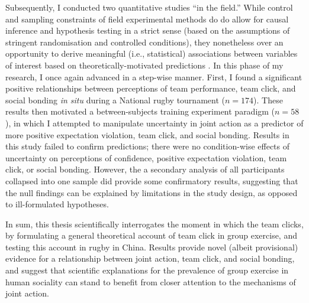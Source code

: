 \begin{CJK}{UTF8}{gbsn}
Subsequently, I conducted two quantitative studies ``in the field.''  While control and sampling constraints of field experimental methods do do allow for causal inference and hypothesis testing in a strict sense (based on the assumptions of stringent randomisation and controlled conditions), they nonetheless over an opportunity to derive meaningful (i.e., statistical) associations between variables of interest based on theoretically-motivated predictions \citep{Xygalatas2013}.  In this phase of my research, I once again advanced in a step-wise manner.  First, I found a significant positive relationships between perceptions of team performance, team click, and social bonding \textit{in situ} during a National rugby tournament ($n = 174$).  These results then motivated a between-subjects training experiment paradigm ($n = 58$), in which I attempted to manipulate uncertainty in joint action as a predictor of more positive expectation violation, team click, and social bonding.  Results in this study failed to confirm predictions; there were no condition-wise effects of uncertainty on perceptions of confidence, positive expectation violation, team click, or social bonding.   However, the a secondary analysis of all participants collapsed into one sample did provide some confirmatory results, suggesting that the null findings can be explained by limitations in the study design, as opposed to ill-formulated hypotheses.

In sum, this thesis scientifically interrogates the moment in which the team clicks, by formulating a general theoretical account of team click in group exercise, and testing this account in rugby in China.  Results provide novel (albeit provisional) evidence for a relationship between joint action, team click, and social bonding, and suggest that scientific explanations for the prevalence of group exercise in human sociality can stand to benefit from closer attention to the mechanisms of joint action.














\end{CJK}
